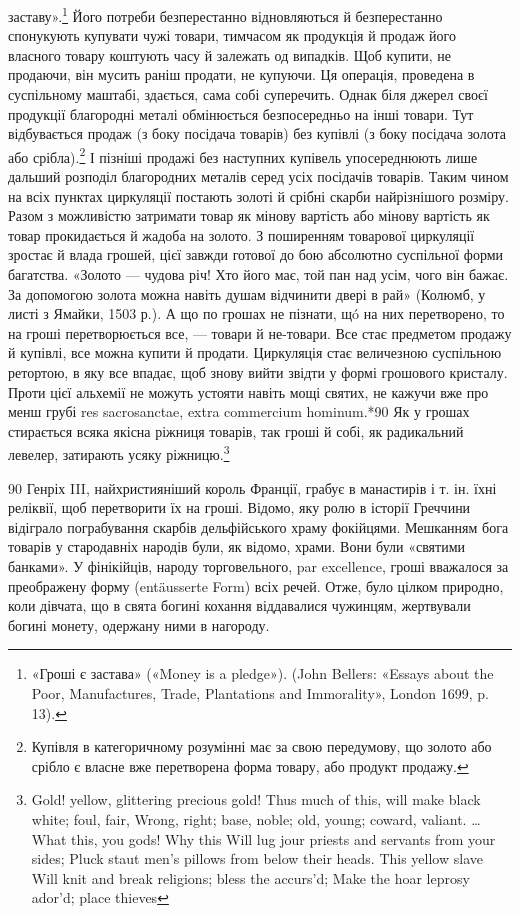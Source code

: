 \parcont{}  %
заставу».\footnote{
«Гроші є застава» («Money is a pledge»). (John Bellers: «Essays
about the Poor, Manufactures, Trade, Plantations and Immorality», London
1699, p. 13).
} Його потреби безперестанно відновляються й безперестанно
спонукують купувати чужі товари, тимчасом як продукція
й продаж його власного товару коштують часу й залежать
од випадків. Щоб купити, не продаючи, він мусить раніш продати,
не купуючи. Ця операція, проведена в суспільному маштабі,
здається, сама собі суперечить. Однак біля джерел своєї продукції
благородні металі обмінюється безпосередньо на інші товари.
Тут відбувається продаж (з боку посідача товарів) без купівлі
(з боку посідача золота або срібла).\footnote{
Купівля в категоричному розумінні має за свою передумову, що
золото або срібло є власне вже перетворена форма товару, або продукт
продажу.
} І пізніші продажі без наступних
купівель упосереднюють лише дальший розподіл благородних
металів серед усіх посідачів товарів. Таким чином на
всіх пунктах циркуляції постають золоті й срібні скарби найрізнішого
розміру. Разом з можливістю затримати товар як
мінову вартість або мінову вартість як товар прокидається й
жадоба на золото. З поширенням товарової циркуляції зростає й
влада грошей, цієї завжди готової до бою абсолютно суспільної
форми багатства. «Золото — чудова річ! Хто його має, той пан
над усім, чого він бажає. За допомогою золота можна навіть
душам відчинити двері в рай» (Колюмб, у листі з Ямайки, 1503 р.).
А що по грошах не пізнати, щó на них перетворено, то на гроші
перетворюється все, — товари й не-товари. Все стає предметом
продажу й купівлі, все можна купити й продати. Циркуляція
стає величезною суспільною ретортою, в яку все впадає, щоб
знову вийти звідти у формі грошового кристалу. Проти цієї
альхемії не можуть устояти навіть мощі святих, не кажучи вже
про менш грубі res sacrosanctae, extra commercium hominum.*90
Як у грошах стирається всяка якісна ріжниця товарів, так гроші
й собі, як радикальний левелер, затирають усяку ріжницю.\footnote{
Gold! yellow, glittering precious gold!
Thus much of this, will make black white; foul, fair,
Wrong, right; base, noble; old, young; coward, valiant.
\dots{} What this, you gods! Why this
Will lug jour priests and servants from your sides;
Pluck staut men’s pillows from below their heads.
This yellow slave
Will knit and break religions; bless the accurs'd;
Make the hoar leprosy ador’d; place thieves
}

90    Генріх III, найхристияніший король Франції, грабує в манастирів
і т. ін. їхні реліквії, щоб перетворити їх на гроші. Відомо, яку ролю
в історії Греччини відіграло пограбування скарбів дельфійського храму
фокійцями. Мешканням бога товарів у стародавніх народів були, як відомо,
храми. Вони були «святими банками». У фінікійців, народу торговельного,
par excellence, гроші вважалося за преображену форму (entäusserte
Form) всіх речей. Отже, було цілком природно, коли дівчата, що в
свята богині кохання віддавалися чужинцям, жертвували богині монету,
одержану ними в нагороду.

